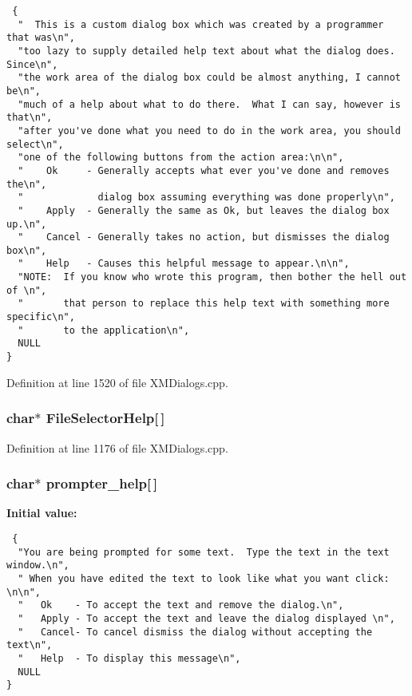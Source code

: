 \footnotesize\begin{verbatim} {
  "  This is a custom dialog box which was created by a programmer that was\n",
  "too lazy to supply detailed help text about what the dialog does.  Since\n",
  "the work area of the dialog box could be almost anything, I cannot be\n",
  "much of a help about what to do there.  What I can say, however is that\n",
  "after you've done what you need to do in the work area, you should select\n",
  "one of the following buttons from the action area:\n\n",
  "    Ok     - Generally accepts what ever you've done and removes the\n",
  "             dialog box assuming everything was done properly\n",
  "    Apply  - Generally the same as Ok, but leaves the dialog box up.\n",
  "    Cancel - Generally takes no action, but dismisses the dialog box\n",
  "    Help   - Causes this helpful message to appear.\n\n",
  "NOTE:  If you know who wrote this program, then bother the hell out of \n",
  "       that person to replace this help text with something more specific\n",
  "       to the application\n",
  NULL
}\end{verbatim}\normalsize 


Definition at line 1520 of file XMDialogs.cpp.
\subsubsection{\setlength{\rightskip}{0pt plus 5cm}char$\ast$ File\-Selector\-Help[$\,$]\hspace{0.3cm}{\tt  [static]}}\label{XMDialogs_8cpp_a4}




Definition at line 1176 of file XMDialogs.cpp.
\subsubsection{\setlength{\rightskip}{0pt plus 5cm}char$\ast$ prompter\_\-help[$\,$]\hspace{0.3cm}{\tt  [static]}}\label{XMDialogs_8cpp_a2}


{\bf Initial value:}

\footnotesize\begin{verbatim} {
  "You are being prompted for some text.  Type the text in the text window.\n",
  " When you have edited the text to look like what you want click:  \n\n",
  "   Ok    - To accept the text and remove the dialog.\n",
  "   Apply - To accept the text and leave the dialog displayed \n",
  "   Cancel- To cancel dismiss the dialog without accepting the text\n",
  "   Help  - To display this message\n",
  NULL
}\end{verbatim}\normalsize 


